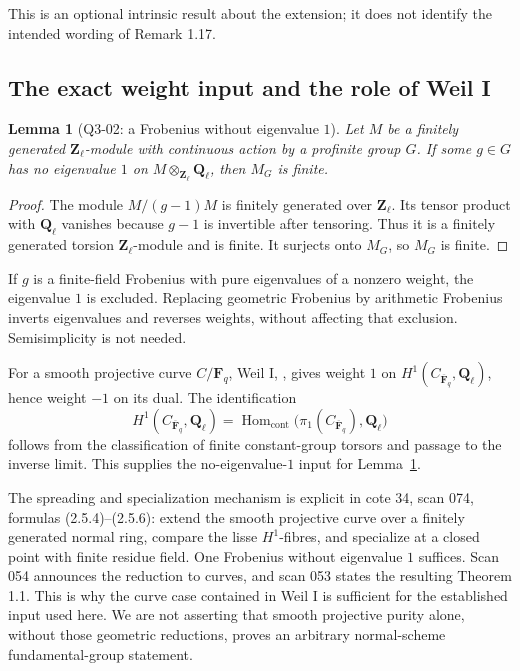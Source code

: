 \documentclass[11pt,a4paper]{article}
\newtheorem{lemma}[theorem]{Lemma}
\theoremstyle{remark}
\begin{document}
This is an optional intrinsic result about the extension; it does
not identify the intended wording of Remark 1.17.

\subsection{The exact weight input and the role of Weil I}

\begin{lemma}[Q3-02: a Frobenius without eigenvalue \(1\)]
\label{q3:weights}
Let \(M\) be a finitely generated \(\mathbf Z_\ell\)-module with
continuous action by a profinite group \(G\).  If some \(g\in G\)
has no eigenvalue \(1\) on \(M\otimes_{\mathbf Z_\ell}\mathbf Q_\ell\),
then \(M_G\) is finite.
\end{lemma}

\begin{proof}
The module \(M/(g-1)M\) is finitely generated over
\(\mathbf Z_\ell\).  Its tensor product with \(\mathbf Q_\ell\)
vanishes because \(g-1\) is invertible after tensoring.  Thus it is
a finitely generated torsion \(\mathbf Z_\ell\)-module and is
finite.  It surjects onto \(M_G\), so \(M_G\) is finite.
\end{proof}

If \(g\) is a finite-field Frobenius with pure eigenvalues of a
nonzero weight, the eigenvalue \(1\) is excluded.  Replacing
geometric Frobenius by arithmetic Frobenius inverts eigenvalues
and reverses weights, without affecting that exclusion.
Semisimplicity is not needed.

For a smooth projective curve \(C/\mathbf F_q\), Weil I,
\cite[(1.6)--(1.7)]{WeilI}, gives weight \(1\) on
\(H^1(C_{\overline{\mathbf F}_q},\mathbf Q_\ell)\), hence weight
\(-1\) on its dual.  The identification
\[
H^1(C_{\overline{\mathbf F}_q},\mathbf Q_\ell)
=\operatorname{Hom}_{\mathrm{cont}}
 \bigl(\pi_1(C_{\overline{\mathbf F}_q}),\mathbf Q_\ell\bigr)
\]
follows from the classification of finite constant-group torsors
and passage to the inverse limit.  This supplies the
no-eigenvalue-\(1\) input for Lemma~\ref{q3:weights}.

The spreading and specialization mechanism is explicit in cote
34, scan 074, formulas (2.5.4)--(2.5.6): extend the smooth
projective curve over a finitely generated normal ring, compare
the lisse \(H^1\)-fibres, and specialize at a closed point with
finite residue field.  One Frobenius without eigenvalue \(1\)
suffices.  Scan 054 announces the reduction to curves, and scan
053 states the resulting Theorem 1.1.  This is why the curve
case contained in Weil I is sufficient for the established input
used here.  We are not asserting that smooth projective purity
alone, without those geometric reductions, proves an arbitrary
normal-scheme fundamental-group statement.
\end{document}
